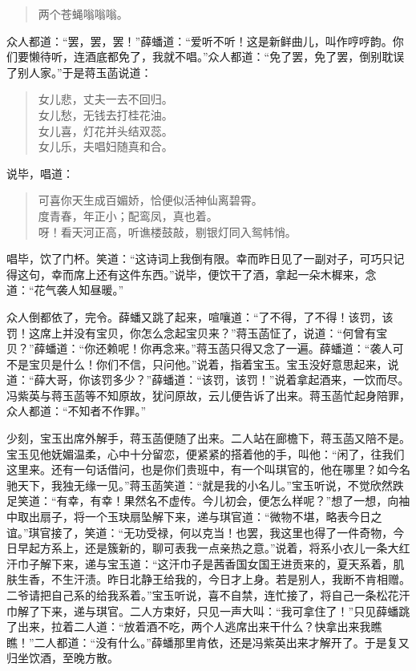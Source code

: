 \documentclass[12pt,oneside]{book}
\newenvironment{shici}{%
\begin{verse}%
\centering\large\hspace{12pt}}%
{\end{verse}}
\begin{document}
\begin{shici}
两个苍蝇嗡嗡嗡。
\end{shici}


众人都道：“罢，罢，罢！”薛蟠道：“爱听不听！这是新鲜曲儿，叫作哼哼韵。你们要懒待听，连酒底都免了，我就不唱。”众人都道：“免了罢，免了罢，倒别耽误了别人家。”于是蒋玉菡说道：

\begin{shici}
女儿悲，丈夫一去不回归。\\
女儿愁，无钱去打桂花油。\\
女儿喜，灯花并头结双蕊。\\
女儿乐，夫唱妇随真和合。
\end{shici}


说毕，唱道：

\begin{shici}
可喜你天生成百媚娇，恰便似活神仙离碧霄。\\
度青春，年正小；配鸾凤，真也着。\\
呀！看天河正高，听谯楼鼓敲，剔银灯同入鸳帏悄。
\end{shici}


唱毕，饮了门杯。笑道：“这诗词上我倒有限。幸而昨日见了一副对子，可巧只记得这句，幸而席上还有这件东西。”说毕，便饮干了酒，拿起一朵木樨来，念道：“花气袭人知昼暖。”

众人倒都依了，完令。薛蟠又跳了起来，喧嚷道：“了不得，了不得！该罚，该罚！这席上并没有宝贝，你怎么念起宝贝来？”蒋玉菡怔了，说道：“何曾有宝贝？”薛蟠道：“你还赖呢！你再念来。”蒋玉菡只得又念了一遍。薛蟠道：“袭人可不是宝贝是什么！你们不信，只问他。”说着，指着宝玉。宝玉没好意思起来，说道：“薛大哥，你该罚多少？”薛蟠道：“该罚，该罚！”说着拿起酒来，一饮而尽。冯紫英与蒋玉菡等不知原故，犹问原故，云儿便告诉了出来。蒋玉菡忙起身陪罪，众人都道：“不知者不作罪。”

少刻，宝玉出席外解手，蒋玉菡便随了出来。二人站在廊檐下，蒋玉菡又陪不是。宝玉见他妩媚温柔，心中十分留恋，便紧紧的搭着他的手，叫他：“闲了，往我们这里来。还有一句话借问，也是你们贵班中，有一个叫琪官的，他在哪里？如今名驰天下，我独无缘一见。”蒋玉菡笑道：“就是我的小名儿。”宝玉听说，不觉欣然跌足笑道：“有幸，有幸！果然名不虚传。今儿初会，便怎么样呢？”想了一想，向袖中取出扇子，将一个玉玦扇坠解下来，递与琪官道：“微物不堪，略表今日之谊。”琪官接了，笑道：“无功受禄，何以克当！也罢，我这里也得了一件奇物，今日早起方系上，还是簇新的，聊可表我一点亲热之意。”说着，将系小衣儿一条大红汗巾子解下来，递与宝玉道：“这汗巾子是茜香国女国王进贡来的，夏天系着，肌肤生香，不生汗渍。昨日北静王给我的，今日才上身。若是别人，我断不肯相赠。二爷请把自己系的给我系着。”宝玉听说，喜不自禁，连忙接了，将自己一条松花汗巾解了下来，递与琪官。二人方束好，只见一声大叫：“我可拿住了！”只见薛蟠跳了出来，拉着二人道：“放着酒不吃，两个人逃席出来干什么？快拿出来我瞧瞧！”二人都道：“没有什么。”薛蟠那里肯依，还是冯紫英出来才解开了。于是复又归坐饮酒，至晚方散。
\end{document}

